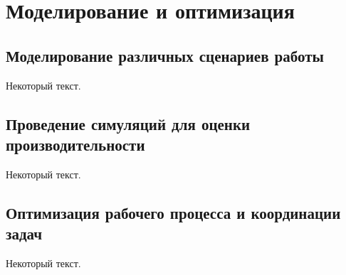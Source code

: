 \chapter{Моделирование и оптимизация}\label{ch:ch3}

\section{Моделирование различных сценариев работы}\label{sec:ch3/sec1}

Некоторый текст.

\section{Проведение симуляций для оценки производительности}\label{sec:ch3/sec2}

Некоторый текст.

\section{Оптимизация рабочего процесса и координации задач}\label{sec:ch3/sec3}

Некоторый текст.

\FloatBarrier